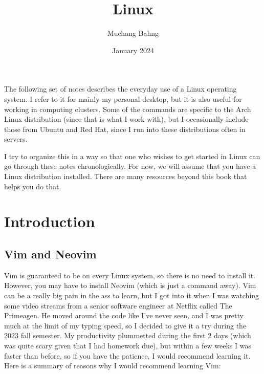 \documentclass{article}
\theoremstyle{definition}
\begin{document}
\pagestyle{fancy}

\cfoot{\thepage / \pageref{LastPage}}

\title{Linux}
\author{Muchang Bahng}
\date{January 2024}

\maketitle

\tableofcontents

\pagebreak 

The following set of notes describes the everyday use of a Linux operating system. I refer to it for mainly my personal desktop, but it is also useful for working in computing clusters. Some of the commands are specific to the Arch Linux distribution (since that is what I work with), but I occasionally include those from Ubuntu and Red Hat, since I run into these distributions often in servers. 

I try to organize this in a way so that one who wishes to get started in Linux can go through these notes chronologically. For now, we will assume that you have a Linux distribution installed. There are many resources beyond this book that helps you do that. 

  
\section{Introduction}

  \subsection{Vim and Neovim}
    
    Vim is guaranteed to be on every Linux system, so there is no need to install it. However, you may have to install Neovim (which is just a command away). Vim can be a really big pain in the ass to learn, but I got into it when I was watching some video streams from a senior software engineer at Netflix called The Primeagen. He moved around the code like I've never seen, and I was pretty much at the limit of my typing speed, so I decided to give it a try during the 2023 fall semester. My productivity plummetted during the first 2 days (which was quite scary given that I had homework due), but within a few weeks I was faster than before, so if you have the patience, I would recommend learning it. Here is a summary of reasons why I would recommend learning Vim: 
    
\end{document}
